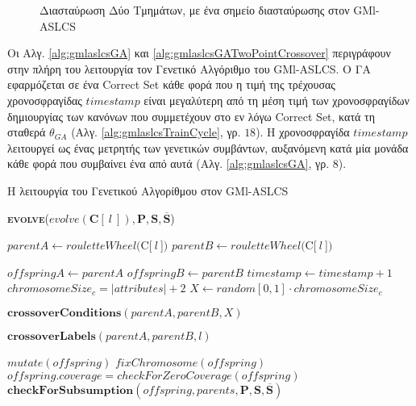 \begin{figure}[h!]
\centering
  
  \caption{Διασταύρωση Δύο Τμημάτων, με ένα σημείο διασταύρωσης στον GMl-ASLCS}
  \label{fig:twoSegmentCrossoverSamePointOffsprings}
\end{figure}

Οι Αλγ. \ref{alg:gmlaslcsGA} και \ref{alg:gmlaslcsGATwoPointCrossover} περιγράφουν στην πλήρη του λειτουργία τον Γενετικό Αλγόριθμο του GMl-ASLCS. Ο ΓΑ εφαρμόζεται σε ένα Correct Set κάθε φορά που η τιμή της τρέχουσας χρονοσφραγίδας $timestamp$ είναι μεγαλύτερη από τη μέση τιμή των χρονοσφραγίδων δημιουργίας των κανόνων που συμμετέχουν στο εν λόγω Correct Set, κατά τη σταθερά $\theta_{GA}$ (Αλγ. \ref{alg:gmlaslcsTrainCycle}, γρ. $18$). Η χρονοσφραγίδα $timestamp$ λειτουργεί ως ένας μετρητής των γενετικών συμβάντων, αυξανόμενη κατά μία μονάδα κάθε φορά που συμβαίνει ένα από αυτά (Αλγ. \ref{alg:gmlaslcsGA}, γρ. $8$).


\begin{algorithm}[h!]
 \caption{Η λειτουργία του Γενετικού Αλγορίθμου στον GMl-ASLCS}
\label{alg:gmlaslcsGA}
 \begin{algorithmic}[1]
  	\STATE \textbf{\textsc{evolve}}($evolve(\textbf{C}[\:l\:]), \textbf{P}, \textbf{S}, \overline{\textbf{S}}$)
  
  	\STATE $parentA \gets rouletteWheel($C[$\:l\:$]$)$
 	\STATE $parentB \gets rouletteWheel($C[$\:l\:$]$)$

 	
 		\STATE $offspringA \gets parentA$
 		\STATE $offspringB \gets parentB$
 	\ELSE	
 		\STATE $timestamp \gets timestamp +1$
  		\STATE $chromosomeSize_c = |attributes| + 2$
  		\STATE $X \gets random[0,1] \cdot chromosomeSize_c$
  	
			\STATE $\textbf{crossoverConditions}(parentA, parentB, X)$  
  		\ENDIF		

		\STATE $\textbf{crossoverLabels}(parentA, parentB, l)$
		
	\ENDIF	
		\STATE $mutate(offspring)$
		\STATE $fixChromosome(offspring)$
		\STATE $offspring.coverage = checkForZeroCoverage(offspring)$	
			\STATE $\textbf{checkForSubsumption}(offspring, parents, \textbf{P}, \textbf{S}, \overline{\textbf{S}})$
		\ENDIF
	\ENDFOR
	

 \end{algorithmic}
\end{algorithm}    
 
